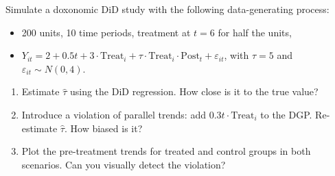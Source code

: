 \begin{exercise}[Computational]
Simulate a doxonomic DiD study with the following data-generating process:
\begin{itemize}[nosep]
  \item 200 units, 10 time periods, treatment at $t = 6$ for half the units,
  \item $Y_{it} = 2 + 0.5t + 3 \cdot \text{Treat}_i + \tau \cdot \text{Treat}_i \cdot \text{Post}_t + \varepsilon_{it}$, with $\tau = 5$ and $\varepsilon_{it} \sim N(0, 4)$.
\end{itemize}
\begin{enumerate}[nosep]
  \item Estimate $\hat{\tau}$ using the DiD regression. How close is it to the true value?
  \item Introduce a violation of parallel trends: add $0.3t \cdot \text{Treat}_i$ to the DGP. Re-estimate $\hat{\tau}$. How biased is it?
  \item Plot the pre-treatment trends for treated and control groups in both scenarios. Can you visually detect the violation?
\end{enumerate}
\end{exercise}

